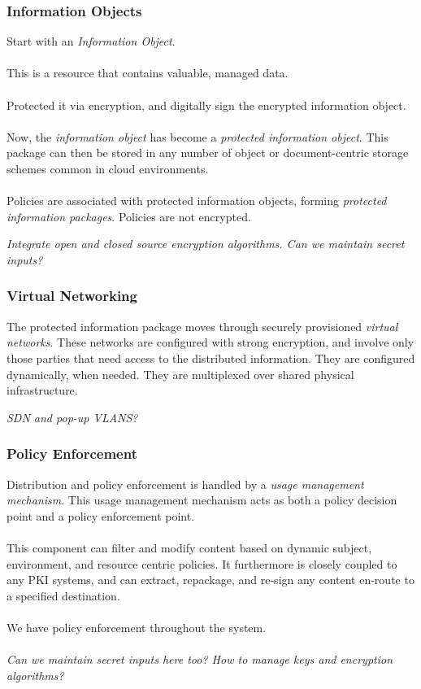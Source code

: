 \documentclass[t,handout]{beamer}
\begin{document}
\begin{frame}
\frametitle{Information Objects}
Start with an {\sl Information Object}.\\~\\

This is a resource that contains valuable, managed data.\\~\\

Protected it via encryption, and digitally sign the encrypted information object. \\~\\

Now, the {\sl information object} has become a {\sl protected information object}.  This package can then be stored in any number of object or document-centric storage schemes common in cloud environments.\\~\\

Policies are associated with protected information objects, forming {\sl protected information packages}.  Policies are not encrypted.

{\sl Integrate open and closed source encryption algorithms.  Can we maintain secret inputs? }
\end{frame}

\begin{frame}
\frametitle{Virtual Networking}
The protected information package moves through securely provisioned {\sl virtual networks}.  These networks are configured with strong encryption, and involve only those parties that need access to the distributed information.  They are configured dynamically, when needed.  They are multiplexed over shared physical infrastructure.

{\sl SDN and pop-up VLANS?}
\end{frame}

\begin{frame}
\frametitle{Policy Enforcement}
Distribution and policy enforcement is handled by a {\sl usage management mechanism}.  This usage management mechanism acts as both a policy decision point and a policy enforcement point. \\~\\

This component can filter and modify content based on dynamic subject, environment, and resource centric policies. It furthermore is closely coupled to any PKI systems, and can extract, repackage, and re-sign any content en-route to a specified destination.\\~\\

We have policy enforcement throughout the system.\\~\\

{\sl Can we maintain secret inputs here too? How to manage keys and encryption algorithms?}
\end{frame}
\end{document}
